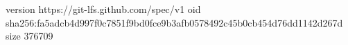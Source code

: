 version https://git-lfs.github.com/spec/v1
oid sha256:fa5adcb4d997f0c7851f9bd0fce9b3afb0578492c45b0cb454d76dd1142d267d
size 376709
